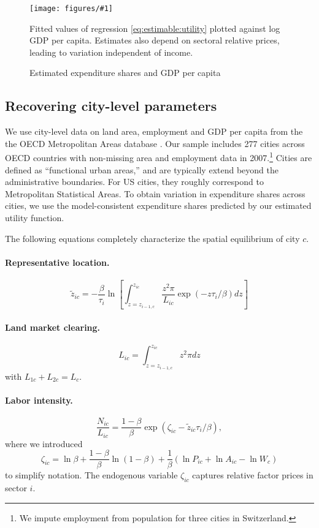 \documentclass[12pt]{article}
\newcommand{\dofigure}[3]{\begin{figure}
\begin{centering}
\texttt{[image: figures/\#1]}
  \caption{#2\label{fig:#1}}
\end{centering}

\noindent \footnotesize{#3}
\end{figure}}
\begin{document}
\dofigure{city_level_inputs/expenditure_shares}{Estimated expenditure shares and GDP per capita}{Fitted values of regression \eqref{eq:estimable:utility} plotted against log GDP per capita. Estimates also depend on sectoral relative prices, leading to variation independent of income.}

\subsection{Recovering city-level parameters}
We use city-level data on land area, employment and GDP per capita from the the OECD Metropolitan Areas database \cite{oecd}. Our sample includes 277 cities across OECD countries with non-missing area and employment data in 2007.\footnote{We impute employment from population for three cities in Switzerland.} Cities are defined as ``functional urban areas,'' and are typically extend beyond the administrative boundaries. For US cities, they roughly correspond to Metropolitan Statistical Areas. To obtain variation in expenditure shares across cities, we use the model-consistent expenditure shares predicted by our estimated utility function. 

The following equations completely characterize the spatial equilibrium of city $c$.

\paragraph{Representative location.}
\begin{equation}\label{eq:representative_location}
	\tilde z_{ic}
	=
	- \frac {\beta}{\tau_i}
	\ln
	\left[
	\int_{z=z_{i-1,c}}^{z_{ic}}
		\frac {z^2\pi}{L_{ic}}
		\exp(-z \tau_i/\beta)
		dz
	\right]
\end{equation}
\paragraph{Land market clearing.}
\begin{equation}\label{eq:land_market_clearing}
	L_{ic}
	=
	\int_{z=z_{i-1,c}}^{z_{ic}}
		z^2\pi
		dz
\end{equation}
with $L_{1c}+L_{2c}=L_c$.

\paragraph{Labor intensity.}
\begin{equation}\label{eq:labor_intensity}
	\frac 	{N_{ic}}
			{L_{ic}}
	=
	\frac 	{1-\beta}
			{\beta}
	\exp(\zeta_{ic}-\tilde z_{ic} \tau_i/\beta),
\end{equation}
where we introduced
\[
\zeta_{ic}=\ln\beta + \frac{1-\beta}{\beta} \ln (1-\beta)
+ \frac 1{\beta} (\ln P_{ic} + \ln A_{ic} - \ln W_c)
\]
to simplify notation. The endogenous variable $\zeta_{ic}$ captures relative factor prices in sector $i$.
\end{document}

